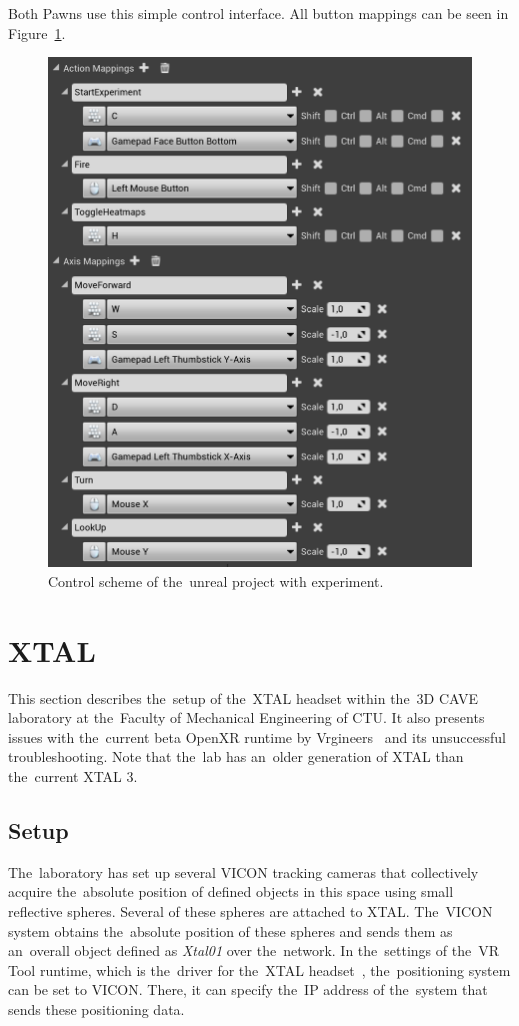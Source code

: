 Both Pawns use this simple control interface. All button mappings can be seen in Figure~\ref{fig:controls}.

\begin{figure}[!ht]\centering
    \includegraphics[width=\textwidth]{img/controls.png}
    \caption{Control scheme of the~unreal project with experiment.}
    \label{fig:controls}
\end{figure}

\pagebreak{}

\section{XTAL}

This section describes the~setup of the~XTAL headset within the~3D CAVE laboratory at the~Faculty of Mechanical Engineering of CTU. It also presents issues with the~current beta OpenXR runtime by Vrgineers~\cite{vrgineers-openxr-soft} and its unsuccessful troubleshooting. Note that the~lab has an~older generation of XTAL than the~current XTAL 3.

\subsection{Setup}
The~laboratory has set up several VICON tracking cameras that collectively acquire the~absolute position of defined objects in this space using small reflective spheres. Several of these spheres are attached to XTAL. The~VICON system obtains the~absolute position of these spheres and sends them as an~overall object defined as \emph{Xtal01} over the~network. In the~settings of the~VR Tool runtime, which is the~driver for the~XTAL headset~\cite{vr-tool}, the~positioning system can be set to VICON. There, it can specify the~IP address of the~system that sends these positioning data.

